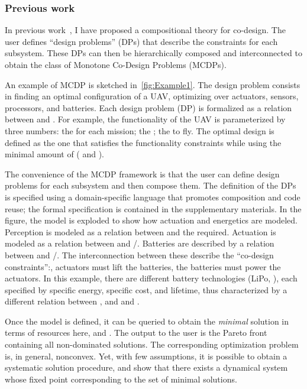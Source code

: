 \subsubsection*{Previous work}

In previous work~\cite{censi15monotone,censi15same,censi16codesign_sep16},
I have proposed a compositional theory for co-design.
The user defines ``design problems'' (DPs) that describe the constraints for each subsystem.
These DPs can then be hierarchically composed and interconnected to obtain the class of Monotone Co-Design Problems (MCDPs).

An example of MCDP is sketched in~\cref{fig:Example1}.
The design problem consists in finding an optimal configuration of a UAV, optimizing over actuators, sensors, processors, and batteries.
Each design problem (DP) is formalized as a relation between 
and .
For example, the functionality of the UAV is parameterized by three numbers: the  for each mission; the ; the  to fly.
The optimal design is defined as the one that satisfies the functionality constraints while using the minimal amount of  ( and ).

The convenience of the MCDP framework is that the user can define design problems for each subsystem and then compose them.
The definition of the DPs is specified using a domain-specific language that promotes composition and code reuse; the formal specification is contained in the supplementary materials.
In the figure, the model is exploded to show how actuation and energetics are modeled.
Perception is modeled as a relation between  and the  required.
Actuation is modeled as a relation between  and /.
Batteries are described by a relation between  and /.
The interconnection between these describe the ``co-design constraints'':\eg , actuators must lift the batteries, the batteries must power the actuators.
In this example, there are different battery technologies (LiPo, \etc), each specified by specific energy, specific cost, and lifetime, thus characterized by a different relation between ,  and  and .

Once the model is defined, it can be queried to obtain the \emph{minimal} solution in terms of resources \textemdash{} here,  and .
The output to the user is the Pareto front containing all non-dominated solutions.
The corresponding optimization problem is, in general, nonconvex.
Yet, with few assumptions, it is possible to obtain a systematic solution procedure, and show that there exists a dynamical system whose fixed point corresponding to the set of minimal solutions.

